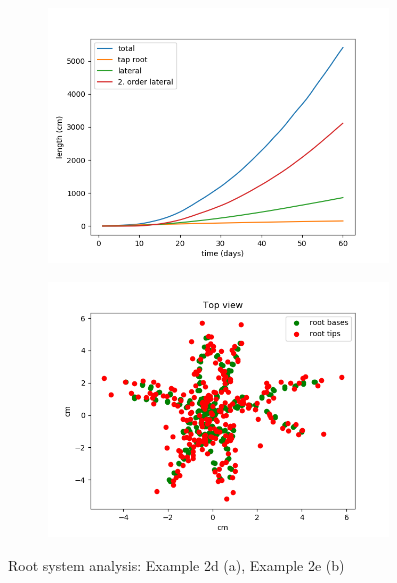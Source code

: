 \begin{figure}
\begin{subfigure}[c]{0.5\textwidth}
\includegraphics[width=0.99\textwidth]{example_3a.png}
 \label{fig:length}
\end{subfigure}
\begin{subfigure}[c]{0.5\textwidth}
\includegraphics[width=0.99\textwidth]{example_3b.png}
 \label{fig:scatter}
\end{subfigure}
\caption{Root system analysis: Example 2d (a), Example 2e (b)} 
\end{figure}




